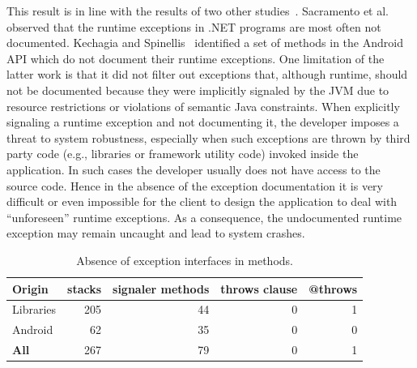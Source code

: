 This result is in line with the results of two other studies~\cite{sacramento2006unchecked,kechagia2014}. 
Sacramento et al.~\cite{sacramento2006unchecked} observed that the
runtime exceptions in .NET programs are most often not documented. 
Kechagia and Spinellis~\cite{kechagia2014} identified a set of methods 
in the Android API which do not document their runtime exceptions. One limitation 
of the latter work is that it did not filter out exceptions that,  
although runtime, should not be documented because they were implicitly signaled by the 
JVM due to resource restrictions or violations of semantic Java constraints.
When explicitly signaling a runtime exception and not documenting it, 
the developer imposes a threat to system robustness, especially
when such exceptions are thrown by third party code (e.g., libraries or framework utility code)
 invoked inside the application. In such cases the developer usually does not have access to 
the source code. Hence in the absence of the exception documentation it is very difficult or even impossible
 for the client to design the application to deal with ``unforeseen'' runtime exceptions. As a consequence, the
 undocumented runtime exception may remain uncaught and lead to system crashes.

\bigskip


\bigskip

\begin{table}
\scriptsize
\centering

\begin{tabular}{lrrrr}
    \hline
 \bfseries{Origin}   &  \bfseries{stacks}  & \bfseries{signaler methods} &  \bfseries{throws clause}  &  \bfseries{@throws}  \\ 
\hline					
Libraries	& 	205	 & 	44	& 0	& 1	\\
Android  	&	62 &	35	&0 &  0	\\					
\hline					
\bfseries{All}	&	267 &	79 &  0  & 1\\
\hline					
  \end{tabular}
\caption{Absence of exception interfaces in methods.}
\label{tab:runtimeinterface}
\end{table}

